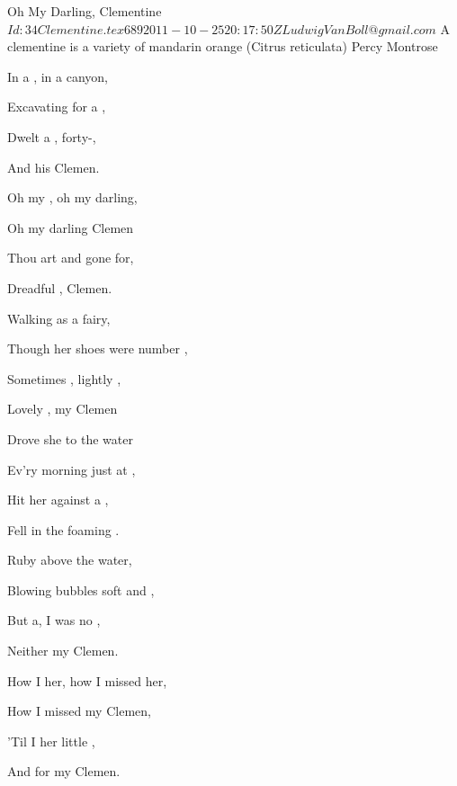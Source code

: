 \begin{SBSong}{Oh My Darling, Clementine}
  {$Id: 34Clementine.tex 689 2011-10-25 20:17:50Z LudwigVanBoll@gmail.com $}
  {A clementine is a variety of mandarin orange (Citrus reticulata)}
  {Percy Montrose}
  \begin{SBVerse}
    In a , in a canyon, 
    
    Excavating for a , 
    
    Dwelt a , forty-,
 
    And his  Clemen.
  \end{SBVerse}
  \begin{SBChorus}
    Oh my , oh my darling, 
    
    Oh my darling Clemen 
    
    Thou art  and gone for, 
    
    Dreadful , Clemen.
  \end{SBChorus}
  \begin{SBVerse}
    Walking  as a fairy, 
    
    Though her shoes were number , 
    
    Sometimes , lightly , 
    
    Lovely , my Clemen
  \end{SBVerse}
  \begin{SBVerse}
    Drove she  to the water 
    
    Ev'ry morning just at , 
    
    Hit her  against a ,
 
    Fell in the foaming .
  \end{SBVerse}
  \begin{SBVerse}
    Ruby  above the water, 
    
    Blowing bubbles soft and , 
    
    But a, I was no ,
 
    Neither  my Clemen.
  \end{SBVerse}
  \begin{SBVerse}
    How I  her, how I missed her, 
    
    How I missed my Clemen, 
    
    'Til I  her little , 
    
    And for my Clemen.
  \end{SBVerse}
\end{SBSong}